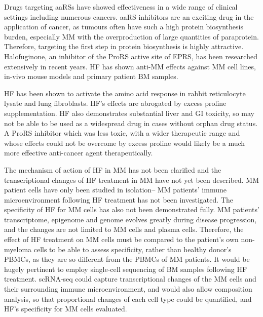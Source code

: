 Drugs targeting aaRSs have showed effectiveness in a wide range of clinical settings including numerous cancers.
aaRS inhibitors are an exciting drug in the application of cancer, as tumours often have such a high protein biosynthesis burden, especially MM with the overproduction of large quantities of paraprotein.
Therefore, targeting the first step in protein biosynthesis is highly attractive.
Halofuginone, an inhibitor of the ProRS active site of EPRS, has been researched extensively in recent years.
HF has shown anti-MM effects against MM cell lines, in-vivo mouse models and primary patient BM samples.

HF has been shown to activate the amino acid response in rabbit reticulocyte lysate and lung fibroblasts.
HF's effects are abrogated by excess proline supplementation.
HF also demonstrates substantial liver and GI toxicity, so may not be able to be used as a widespread drug in cases without orphan drug status.
A ProRS inhibitor which was less toxic, with a wider therapeutic range and whose effects could not be overcome by excess proline would likely be a much more effective anti-cancer agent therapeutically.

The mechanism of action of HF in MM has not been clarified and the transcriptional changes of HF treatment in MM have not yet been described.
MM patient cells have only been studied in isolation-- MM patients' immune microenvironment following HF treatment has not been investigated.
The specificity of HF for MM cells has also not been demonstrated fully.
MM patients' transcriptome, epigenome and genome evolves greatly during disease progression, and the changes are not limited to MM cells and plasma cells.
Therefore, the effect of HF treatment on MM cells must be compared to the patient's own non-myeloma cells to be able to assess specificity, rather than healthy donor's PBMCs, as they are so different from the PBMCs of MM patients.
It would be hugely pertinent to employ single-cell sequencing of BM samples following HF treatment.
scRNA-seq could capture transcriptional changes of the MM cells and their surrounding immune microenvironment, and would also allow composition analysis, so that proportional changes of each cell type could be quantified, and HF's specificity for MM cells evaluated.

